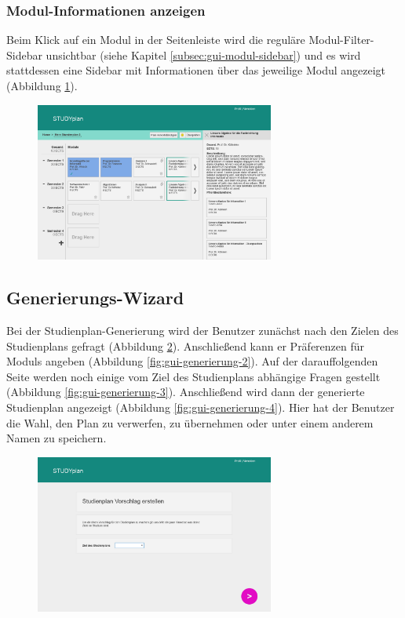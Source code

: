 \subsubsection{Modul-Informationen anzeigen}
Beim Klick auf ein Modul in der Seitenleiste wird die reguläre Modul-Filter-Sidebar unsichtbar (siehe Kapitel \ref{subsec:gui-modul-sidebar}) und es wird stattdessen eine Sidebar mit Informationen über das jeweilige Modul angezeigt (Abbildung \ref{fig:gui-modul-info-1}).
\begin{figure}[!htb]
	\caption{}
	\label{fig:gui-modul-info-1}
	\centering
	\includegraphics[width=0.7\textwidth]{../GUI/ergebnisse/modul-info-1.png}
\end{figure}


\subsection{Generierungs-Wizard}
\label{subsec:gui-generierung}
Bei der Studienplan-Generierung wird der \gls{Benutzer} zunächst nach den Zielen des Studienplans gefragt (Abbildung \ref{fig:gui-generierung-1}). Anschließend kann er Präferenzen für \glspl{Modul} angeben (Abbildung \ref{fig:gui-generierung-2}). Auf der darauffolgenden Seite werden noch einige vom Ziel des Studienplans abhängige Fragen gestellt (Abbildung \ref{fig:gui-generierung-3}). Anschließend wird dann der generierte Studienplan angezeigt (Abbildung \ref{fig:gui-generierung-4}). Hier hat der \gls{Benutzer} die Wahl, den Plan zu verwerfen, zu übernehmen oder unter einem anderem Namen zu speichern.
\begin{figure}[!htb]
	\caption{}
	\label{fig:gui-generierung-1}
	\centering
	\includegraphics[width=0.7\textwidth]{../GUI/ergebnisse/generierung-1.png}
\end{figure}

